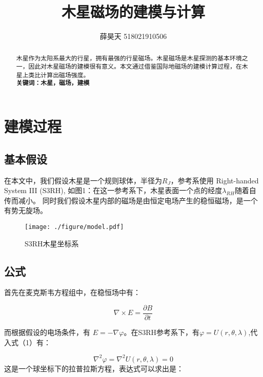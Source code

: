 \documentclass{article}
\begin{document}
\title{木星磁场的建模与计算}
\author{薛昊天 518021910506}
\date{}

\maketitle
\begin{abstract}
   木星作为太阳系最大的行星，拥有最强的行星磁场。木星磁场是木星探测的基本环境之一，因此对木星磁场的建模很有意义。本文通过借鉴国际地磁场的建模计算过程，在木星上类比计算出磁场强度。\\
  \textbf{关键词：木星，磁场，建模}
  
\end{abstract}




\section{建模过程}
 \subsection{基本假设}
   在本文中，我们假设木星是一个规则球体，半径为$R_J$，参考系使用 Right-handed System III
   (S3RH), 如图1：在这一参考系下，木星表面一个点的经度$\lambda_{RH}$随着自传而减小。
   同时我们假设木星内部的磁场是由恒定电场产生的稳恒磁场，是一个有势无旋场。
   
\begin{figure}
    \centering
    \texttt{[image: ./figure/model.pdf]}
    \caption{S3RH木星坐标系}
    \label{fig:my_label}
\end{figure}   

   \subsection{公式}
   首先在麦克斯韦方程组中，在稳恒场中有：
   
   \begin{equation} 
       \nabla \times E = \frac{\partial{B}}{\partial{t}} 
   \end{equation}

   而根据假设的电场条件，有 $E=-\nabla{\varphi}$。在S3RH参考系下，有$\varphi=U(r,\theta,\lambda)$,代入式（1）有：
   
   \begin{equation} 
       \nabla^{2}\varphi=\nabla^{2}U(r,\theta,\lambda)=0
   \end{equation}
   这是一个球坐标下的拉普拉斯方程，表达式可以求出是：
\end{document}
